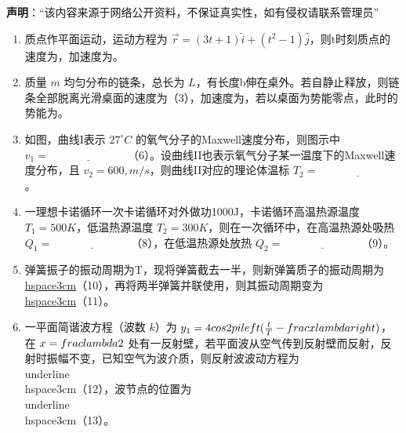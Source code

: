
\textbf{声明}：“该内容来源于网络公开资料，不保证真实性，如有侵权请联系管理员”

\begin{enumerate}
        \item 质点作平面运动，运动方程为 $\vec{r} = (3t + 1) \hat{i} + (t^2 - 1) \hat{j}$，则t时刻质点的速度为\underline{\hspace{2cm}}，加速度为\underline{\hspace{2cm}}。
        
        \item 质量 $m$ 均匀分布的链条，总长为 $L$，有长度b伸在桌外。若自静止释放，则链条全部脱离光滑桌面的速度为\underline{\hspace{3cm}}（3），加速度为\underline{\hspace{3cm}}，若以桌面为势能零点，此时的势能为\underline{\hspace{3cm}}。
        
        \item 如图，曲线I表示 $27^\circ C$ 的氧气分子的Maxwell速度分布，则图示中 $v_1 = \underline{\hspace{3cm}}$（6）。设曲线II也表示氧气分子某一温度下的Maxwell速度分布，且 $v_2 = 600 , m/s$，则曲线II对应的理论体温标 $T_2 = \underline{\hspace{3cm}}$。
        
        \item 一理想卡诺循环一次卡诺循环对外做功1000J，卡诺循环高温热源温度 $T_1 = 500K$，低温热源温度 $T_2 = 300K$，则在一次循环中，在高温热源处吸热 $Q_1 = \underline{\hspace{3cm}}$（8），在低温热源处放热 $Q_2 = \underline{\hspace{3cm}}$（9）。
        
        \item 弹簧振子的振动周期为T，现将弹簧截去一半，则新弹簧质子的振动周期为 \underline{\\hspace{3cm}}（10），再将两半弹簧并联使用，则其振动周期变为 \underline{\\hspace{3cm}}（11）。
        
        \item 一平面简谐波方程（波数 $k$）为 $y_1 = 4 \\cos 2 \\pi \\left( \frac{t}{T} - \\frac{x}{\\lambda} \\right)$，在 $x = \\frac{\\lambda}{2}$ 处有一反射壁，若平面波从空气传到反射壁而反射，反射时振幅不变，已知空气为波介质，则反射波波动方程为 \\underline{\\hspace{3cm}}（12），波节点的位置为 \\underline{\\hspace{3cm}}（13）。
    \end{enumerate}